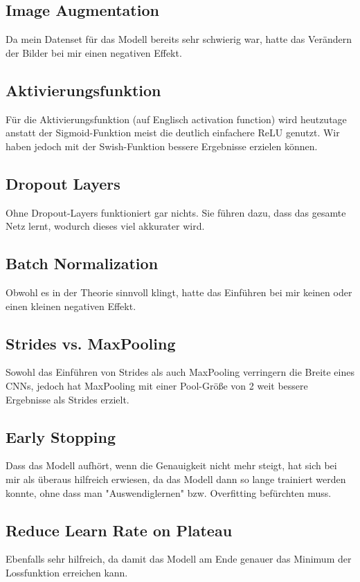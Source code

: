 \documentclass{article}
\begin{document}
\subsection{Image Augmentation}
Da mein Datenset für das Modell bereits sehr schwierig war, hatte das Verändern der Bilder bei mir einen negativen Effekt.

\subsection{Aktivierungsfunktion}
Für die Aktivierungsfunktion (auf Englisch activation function) wird heutzutage anstatt der Sigmoid-Funktion meist die deutlich einfachere ReLU genutzt. Wir haben jedoch mit der Swish-Funktion bessere Ergebnisse erzielen können.

\subsection{Dropout Layers}
Ohne Dropout-Layers funktioniert gar nichts. Sie führen dazu, dass das gesamte Netz lernt, wodurch dieses viel akkurater wird.

\subsection{Batch Normalization}
Obwohl es in der Theorie sinnvoll klingt, hatte das Einführen bei mir keinen oder einen kleinen negativen Effekt.

\subsection{Strides vs. MaxPooling}
Sowohl das Einführen von Strides als auch MaxPooling verringern die Breite eines CNNs, jedoch hat MaxPooling mit einer Pool-Größe von 2 weit bessere Ergebnisse als Strides erzielt.

\subsection{Early Stopping}
Dass das Modell aufhört, wenn die Genauigkeit nicht mehr steigt, hat sich bei mir als überaus hilfreich erwiesen, da das Modell dann so lange trainiert werden konnte, ohne dass man "Auswendiglernen" bzw. Overfitting befürchten muss.

\subsection{Reduce Learn Rate on Plateau}
Ebenfalls sehr hilfreich, da damit das Modell am Ende genauer das Minimum der Lossfunktion erreichen kann.
\end{document}
